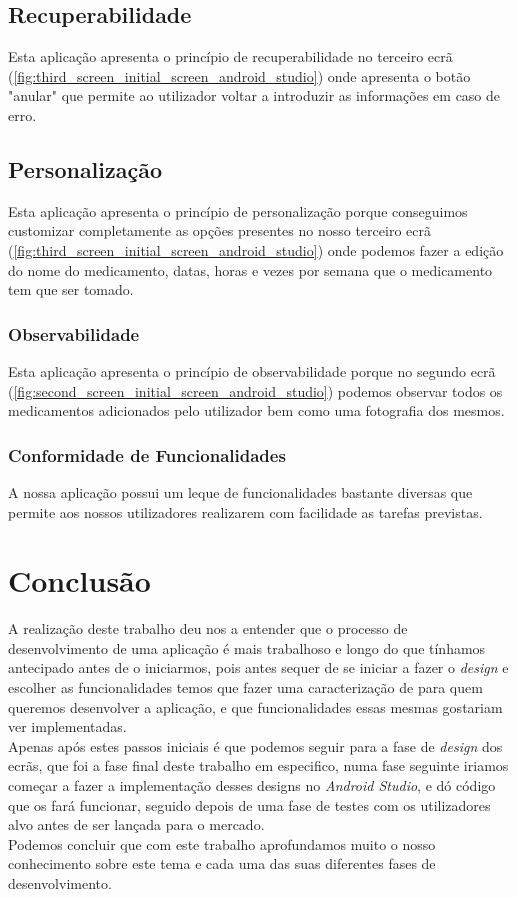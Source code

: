 \documentclass[a4paper]{article}
\begin{document}
\subsection{Recuperabilidade}
Esta aplicação apresenta o princípio de recuperabilidade no terceiro ecrã (\ref{fig:third_screen_initial_screen_android_studio}) onde apresenta o botão "anular" que permite ao utilizador voltar a introduzir as informações em caso de erro.

\subsection{Personalização}
Esta aplicação apresenta o princípio de personalização porque conseguimos customizar completamente as opções presentes no nosso terceiro ecrã (\ref{fig:third_screen_initial_screen_android_studio}) onde podemos fazer a edição do nome do medicamento, datas, horas e vezes por semana que o medicamento tem que ser tomado.

\subsubsection{Observabilidade}
Esta aplicação apresenta o princípio de observabilidade porque no segundo ecrã (\ref{fig:second_screen_initial_screen_android_studio}) podemos observar todos os medicamentos adicionados pelo utilizador bem como uma fotografia dos mesmos.

\subsubsection{Conformidade de Funcionalidades}
A nossa aplicação possui um leque de funcionalidades bastante diversas que permite aos nossos utilizadores realizarem com facilidade as tarefas previstas. 

\newpage

\section{Conclusão}\label{section:summary}
A realização deste trabalho deu nos a entender que o processo de desenvolvimento de uma aplicação é mais trabalhoso e longo do que tínhamos antecipado antes de o iniciarmos, pois antes sequer de se iniciar a fazer o \textit{design} e escolher as funcionalidades temos que fazer uma caracterização de para quem queremos desenvolver a aplicação, e que funcionalidades essas mesmas gostariam ver implementadas.\\
Apenas após estes passos iniciais é que podemos seguir para a fase de \textit{design} dos ecrãs, que foi a fase final deste trabalho em especifico, numa fase seguinte iriamos começar a fazer a implementação desses designs no \textit{Android Studio\texttrademark}, e dó código que os fará funcionar, seguido depois de uma fase de testes com os utilizadores alvo antes de ser lançada para o mercado.\\
Podemos concluir que com este trabalho aprofundamos muito o nosso conhecimento sobre este tema e cada uma das suas diferentes fases de desenvolvimento.

\newpage




\end{document}

